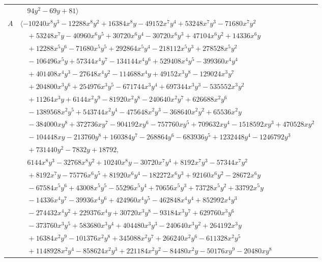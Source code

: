 \documentclass[11pt]{article}
\begin{document}
\begin{longtable}{@{}ll@{}}
 & $\quad 94y^{2}-69y+81\rangle$\\
$A$ & $\langle -10240x^{8}y^{3}-12288x^{8}y^{2}+16384x^{8}y-49152x^{7}y^{4}+53248x^{7}y^{3}-71680x^{7}y^{2}$\\
 & $\quad +53248x^{7}y-40960x^{6}y^{5}+30720x^{6}y^{4}-30720x^{6}y^{3}+47104x^{6}y^{2}+14336x^{6}y$\\
 & $\quad +12288x^{5}y^{6}-71680x^{5}y^{5}+292864x^{5}y^{4}-218112x^{5}y^{3}+278528x^{5}y^{2}$\\
 & $\quad -106496x^{5}y+57344x^{4}y^{7}-134144x^{4}y^{6}+529408x^{4}y^{5}-399360x^{4}y^{4}$\\
 & $\quad +401408x^{4}y^{3}-27648x^{4}y^{2}-114688x^{4}y+49152x^{3}y^{8}-129024x^{3}y^{7}$\\
 & $\quad +204800x^{3}y^{6}+254976x^{3}y^{5}-671744x^{3}y^{4}+697344x^{3}y^{3}-535552x^{3}y^{2}$\\
 & $\quad +11264x^{3}y+6144x^{2}y^{9}-81920x^{2}y^{8}-240640x^{2}y^{7}+626688x^{2}y^{6}$\\
 & $\quad -1389568x^{2}y^{5}+543744x^{2}y^{4}-475648x^{2}y^{3}-368640x^{2}y^{2}+65536x^{2}y$\\
 & $\quad -384000xy^{8}+372736xy^{7}-904192xy^{6}-757760xy^{5}+709632xy^{4}-1518592xy^{3}+470528xy^{2}$\\
 & $\quad -104448xy-213760y^{8}+160384y^{7}-268864y^{6}-683936y^{5}+1232448y^{4}-1246792y^{3}$\\
 & $\quad +731440y^{2}-7832y+18792,$\\
 & $\quad 6144x^{8}y^{3}-32768x^{8}y^{2}+10240x^{8}y-30720x^{7}y^{4}+8192x^{7}y^{3}-57344x^{7}y^{2}$\\
 & $\quad +8192x^{7}y-75776x^{6}y^{5}+81920x^{6}y^{4}-182272x^{6}y^{3}+92160x^{6}y^{2}-28672x^{6}y$\\
 & $\quad -67584x^{5}y^{6}+43008x^{5}y^{5}-55296x^{5}y^{4}+70656x^{5}y^{3}+73728x^{5}y^{2}+33792x^{5}y$\\
 & $\quad -14336x^{4}y^{7}-39936x^{4}y^{6}+424960x^{4}y^{5}-462848x^{4}y^{4}+852992x^{4}y^{3}$\\
 & $\quad -274432x^{4}y^{2}+229376x^{4}y+30720x^{3}y^{8}-93184x^{3}y^{7}+629760x^{3}y^{6}$\\
 & $\quad -373760x^{3}y^{5}+583680x^{3}y^{4}+404480x^{3}y^{3}-240640x^{3}y^{2}+264192x^{3}y$\\
 & $\quad +16384x^{2}y^{9}-101376x^{2}y^{8}+345088x^{2}y^{7}+266240x^{2}y^{6}-611328x^{2}y^{5}$\\
 & $\quad +1148928x^{2}y^{4}-858624x^{2}y^{3}+221184x^{2}y^{2}-84480x^{2}y-50176xy^{9}-20480xy^{8}$\\

\end{longtable}
\end{document}
